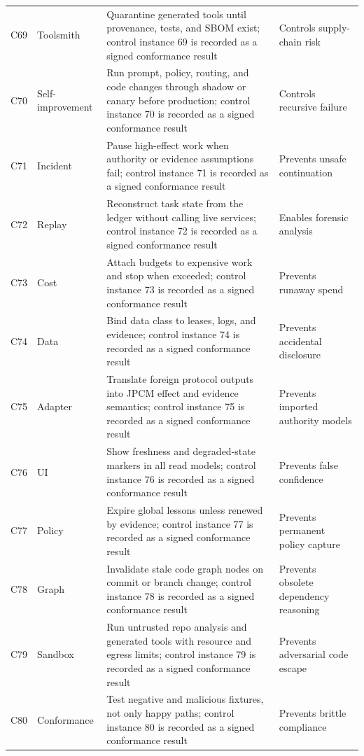\documentclass[10pt,journal,onecolumn]{IEEEtran}
\begin{document}
\begin{longtable}{P{0.06\textwidth} P{0.14\textwidth} P{0.48\textwidth} P{0.24\textwidth}}
C69 & Toolsmith & Quarantine generated tools until provenance, tests, and SBOM exist; control instance 69 is recorded as a signed conformance result & Controls supply-chain risk \\
C70 & Self-improvement & Run prompt, policy, routing, and code changes through shadow or canary before production; control instance 70 is recorded as a signed conformance result & Controls recursive failure \\
C71 & Incident & Pause high-effect work when authority or evidence assumptions fail; control instance 71 is recorded as a signed conformance result & Prevents unsafe continuation \\
C72 & Replay & Reconstruct task state from the ledger without calling live services; control instance 72 is recorded as a signed conformance result & Enables forensic analysis \\
C73 & Cost & Attach budgets to expensive work and stop when exceeded; control instance 73 is recorded as a signed conformance result & Prevents runaway spend \\
C74 & Data & Bind data class to leases, logs, and evidence; control instance 74 is recorded as a signed conformance result & Prevents accidental disclosure \\
C75 & Adapter & Translate foreign protocol outputs into JPCM effect and evidence semantics; control instance 75 is recorded as a signed conformance result & Prevents imported authority models \\
C76 & UI & Show freshness and degraded-state markers in all read models; control instance 76 is recorded as a signed conformance result & Prevents false confidence \\
C77 & Policy & Expire global lessons unless renewed by evidence; control instance 77 is recorded as a signed conformance result & Prevents permanent policy capture \\
C78 & Graph & Invalidate stale code graph nodes on commit or branch change; control instance 78 is recorded as a signed conformance result & Prevents obsolete dependency reasoning \\
C79 & Sandbox & Run untrusted repo analysis and generated tools with resource and egress limits; control instance 79 is recorded as a signed conformance result & Prevents adversarial code escape \\
C80 & Conformance & Test negative and malicious fixtures, not only happy paths; control instance 80 is recorded as a signed conformance result & Prevents brittle compliance \\

\end{longtable}
\end{document}
